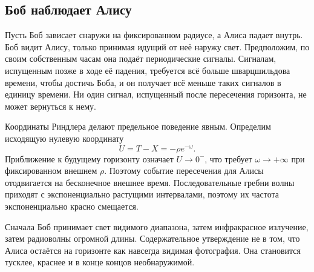 \begin{classroomqa}
\end{classroomqa}

\begin{classroomqa}
\end{classroomqa}

\subsection{Боб наблюдает Алису}

Пусть Боб зависает снаружи на фиксированном радиусе, а Алиса падает внутрь. Боб видит Алису, только принимая идущий от неё наружу свет. Предположим, по своим собственным часам она подаёт периодические сигналы. Сигналам, испущенным позже в ходе её падения, требуется всё больше шварцшильдова времени, чтобы достичь Боба, и он получает всё меньше таких сигналов в единицу времени. Ни один сигнал, испущенный после пересечения горизонта, не может вернуться к нему.

Координаты Риндлера делают предельное поведение явным. Определим исходящую нулевую координату
\begin{equation}
U=T-X=-\rho e^{-\omega}.
\end{equation}
Приближение к будущему горизонту означает \(U\to0^{-}\), что требует \(\omega\to+\infty\) при фиксированном внешнем \(\rho\). Поэтому событие пересечения для Алисы отодвигается на бесконечное внешнее время. Последовательные гребни волны приходят с экспоненциально растущими интервалами, поэтому их частота экспоненциально красно смещается.

Сначала Боб принимает свет видимого диапазона, затем инфракрасное излучение, затем радиоволны огромной длины. Содержательное утверждение не в том, что Алиса остаётся на горизонте как навсегда видимая фотография. Она становится тусклее, краснее и в конце концов необнаружимой.

